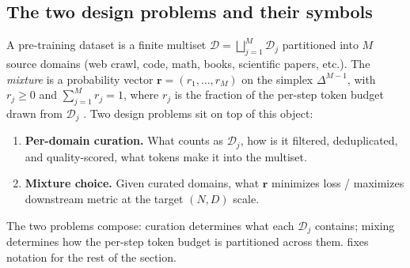 \subsection{The two design problems and their symbols}
\label{sec:data-setup}

A pre-training dataset is a finite multiset $\mathcal{D} =
\bigsqcup_{j=1}^{M} \mathcal{D}_j$ partitioned into $M$ source domains
(web crawl, code, math, books, scientific papers, etc.). The
\emph{mixture} is a probability vector $\mathbf{r} = (r_1, \dots,
r_M)$ on the simplex $\Delta^{M-1}$, with $r_j \geq 0$ and
$\sum_{j=1}^{M} r_j = 1$, where $r_j$ is the fraction of the
per-step token budget drawn from $\mathcal{D}_j$
\citep[\S 2]{data-mixing-laws-2024}. Two design problems sit on top
of this object:

\begin{enumerate}
\item \textbf{Per-domain curation.} What counts as $\mathcal{D}_j$,
how is it filtered, deduplicated, and quality-scored, what tokens
make it into the multiset.
\item \textbf{Mixture choice.} Given curated domains, what
$\mathbf{r}$ minimizes loss / maximizes downstream metric at the
target $(N, D)$ scale.
\end{enumerate}

The two problems compose: curation determines what each
$\mathcal{D}_j$ contains; mixing determines how the per-step token
budget is partitioned across them.  fixes
notation for the rest of the section.


